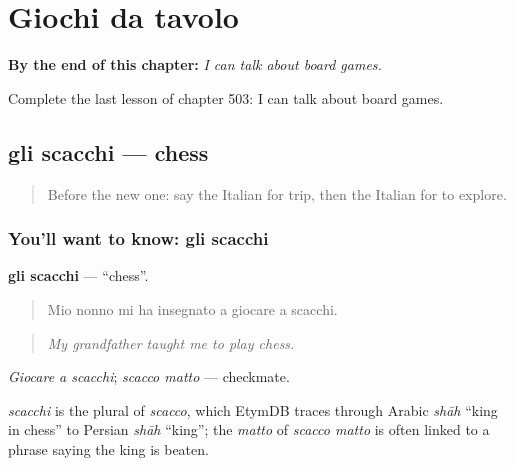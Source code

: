 
\chapter{Giochi da tavolo}
\label{ch:it-giochi-da-tavolo}

\begin{chapteropening}
\textbf{By the end of this chapter:} \emph{I can talk about board games.}

Complete the last lesson of chapter 503: I can talk about board games.
\end{chapteropening}

\section[gli scacchi]{gli scacchi — chess}

\label{lesson:IT-C503-scacchi}



\begin{quote}
Before the new one: say the Italian for trip, then the Italian for to explore.
\end{quote}

\subsection*{You'll want to know: gli scacchi}
\textbf{gli scacchi} — \textquotedblleft{}chess\textquotedblright{}.

\begin{quote}
Mio nonno mi ha insegnato a giocare a scacchi.
\end{quote}

\begin{quote}
\emph{My grandfather taught me to play chess.}
\end{quote}

\emph{Giocare a scacchi}; \emph{scacco matto} — checkmate.

\begin{cousinweb}
\emph{scacchi} is the plural of \emph{scacco}, which EtymDB traces through Arabic \emph{shāh} \textquotedblleft{}king in chess\textquotedblright{} to Persian \emph{shāh} \textquotedblleft{}king\textquotedblright{}; the \emph{matto} of \emph{scacco matto} is often linked to a phrase saying the king is beaten.
\end{cousinweb}

